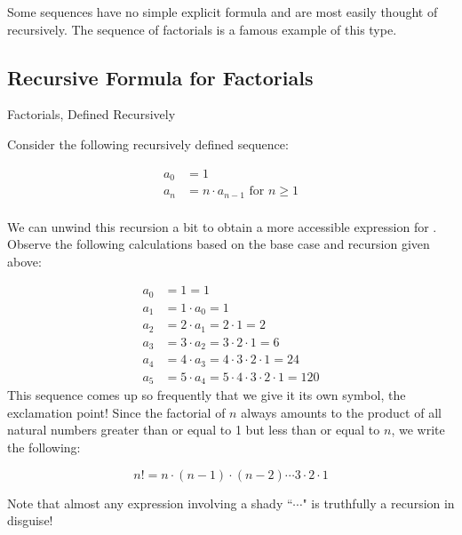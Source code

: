 Some sequences have no simple explicit formula and are most easily thought of recursively.  The sequence of factorials is a famous example of this type.
\subsection{Recursive Formula for Factorials}
\begin{example}{Factorials, Defined Recursively}

Consider the following recursively defined sequence:

\begin{align*}
a_0 &= 1 \\
a_n &= n\cdot a_{n-1}\text{ for }n \geq 1\\ 
\end{align*} 

We can unwind this recursion a bit to obtain a more accessible expression for .  Observe the following calculations based on the base case and recursion given above:

\begin{align*}
a_0 &= 1 =1 \\
a_1 &= 1 \cdot a_0 = 1 \\
a_2 &= 2 \cdot a_1 = 2 \cdot 1=2 \\
a_3 &= 3 \cdot a_2 = 3 \cdot 2 \cdot 1=6 \\
a_4 &= 4 \cdot a_3 = 4 \cdot 3 \cdot 2 \cdot 1=24 \\
a_5 &= 5 \cdot a_4 = 5 \cdot 4 \cdot 3 \cdot 2 \cdot 1 = 120
\end{align*}
This sequence comes up so frequently that we give it its own symbol, the exclamation point!  Since the factorial of $n$ always amounts to the product of all natural numbers greater than or equal to 1 but less than or equal to $n$, we write the following:

$$ n! = n\cdot (n-1) \cdot (n-2) \cdots 3 \cdot 2 \cdot 1 $$

\end{example} 

Note that almost any expression involving a shady ``$\cdots$" is truthfully a recursion in disguise! 


